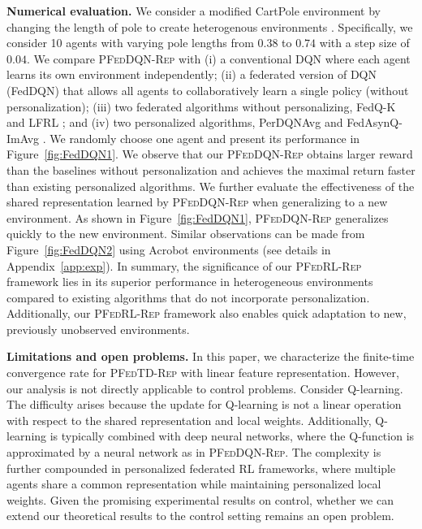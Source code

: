 \documentclass{article} %
\theoremstyle{plain}
\theoremstyle{definition}
\theoremstyle{remark}
\newcommand{\FedRL}{\textsc{PFedRL-Rep}\xspace}
\newcommand{\FedTD}{\textsc{PFedTD-Rep}\xspace}
\begin{document}
{ \textbf{Numerical evaluation.} 
We consider a modified CartPole environment \citep{brockman2016openai} 
by changing the length of pole to create heterogenous environments \citep{jin2022federated}. Specifically, we consider 10 agents with varying pole lengths from $0.38$ to $0.74$ with a step size of $0.04$. We compare \textsc{PFedDQN-Rep} with (i) a conventional DQN where each agent learns its own environment independently; (ii) a federated version of DQN (FedDQN) that allows all agents to collaboratively learn a single policy (without personalization); (iii) two federated algorithms without personalizing, FedQ-K \citep{khodadadian2022federated} and LFRL \citep{liu2019lifelong}; and (iv) two personalized algorithms, PerDQNAvg \citep{jin2022federated} and FedAsynQ-ImAvg \citep{woo2023the}. We randomly choose one agent and present its performance in Figure~\ref{fig:FedDQN1}. We observe that our \textsc{PFedDQN-Rep} obtains larger reward than the baselines without personalization and achieves the maximal return faster than existing personalized algorithms. 
We further evaluate the effectiveness of the shared representation learned by \textsc{PFedDQN-Rep} when generalizing to a new environment. As shown in Figure~\ref{fig:FedDQN1}, \textsc{PFedDQN-Rep} generalizes quickly to the new environment. Similar observations can be made from Figure~\ref{fig:FedDQN2} using Acrobot environments (see details in Appendix~\ref{app:exp}). In summary, the significance of our \FedRL framework  lies in its superior performance in heterogeneous environments compared to existing algorithms that do not incorporate personalization. Additionally, our \FedRL framework also enables quick adaptation to new, previously unobserved environments.



\textbf{Limitations and open problems.}
In this paper, we characterize the finite-time convergence rate for \FedTD with linear feature representation. However, our analysis is not directly applicable to control problems. Consider Q-learning. The difficulty arises because
the update for Q-learning is not a linear operation with respect to the shared representation and local weights. Additionally, Q-learning is typically combined with deep neural networks, where the Q-function is approximated by a neural network as in \textsc{PFedDQN-Rep}. The complexity is further compounded in personalized federated RL frameworks, where multiple agents share a common representation  while maintaining personalized local weights. Given the promising experimental results on control, whether we can extend our theoretical results to the control setting remains an open problem.















}
\end{document}
